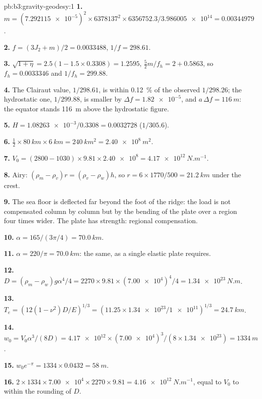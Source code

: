 \begin{solution}{pb:b3:gravity-geodesy:1}
\textbf{1.} $m = (\num{7.292115e-5})^2\times6378137^2\times6356752.3/
\num{3.986005e14} = \num{0.00344979}$.

\textbf{2.} $f = (3J_2 + m)/2 = \num{0.0033488}$, $1/f = 298.61$.

\textbf{3.} $\sqrt{1 + \eta} = 2.5(1 - 1.5\times0.3308) = 1.2595$,
$\tfrac52m/f_h = 2 + 0.5863$, so $f_h = \num{0.0033346}$ and $1/f_h = 299.88$.

\textbf{4.} The Clairaut value, $1/298.61$, is within \qty{0.12}{\percent} of
the observed $1/298.26$; the hydrostatic one, $1/299.88$, is smaller by
$\Delta f = \num{1.82e-5}$, and $a\,\Delta f = \qty{116}{m}$: the equator stands
\qty{116}{m} above the hydrostatic figure.

\textbf{5.} $H = \num{1.08263e-3}/0.3308 = \num{0.0032728}$ ($1/305.6$).

\textbf{6.} $\tfrac12\times\qty{80}{km}\times\qty{6}{km} = \qty{240}{km^2} =
\qty{2.40e8}{m^2}$.

\textbf{7.} $V_0 = (2800 - 1030)\times9.81\times\num{2.40e8} =
\qty{4.17e12}{N.m^{-1}}$.

\textbf{8.} Airy: $(\rho_m - \rho_v)r = (\rho_v - \rho_w)h$, so $r =
6\times1770/500 = \qty{21.2}{km}$ under the crest.

\textbf{9.} The sea floor is deflected far beyond the foot of the ridge: the
load is not compensated column by column but by the bending of the plate over a
region four times wider. The plate has strength: regional compensation.

\textbf{10.} $\alpha = 165/(3\pi/4) = \qty{70.0}{km}$.

\textbf{11.} $\alpha = 220/\pi = \qty{70.0}{km}$: the same, as a single elastic
plate requires.

\textbf{12.} $D = (\rho_m - \rho_w)g\alpha^4/4 = 2270\times9.81\times(\num{7.00e4})^4/4
= \qty{1.34e23}{N.m}$.

\textbf{13.} $T_e = (12(1 - \nu^2)D/E)^{1/3} = (11.25\times\num{1.34e23}/
\num{1e11})^{1/3} = \qty{24.7}{km}$.

\textbf{14.} $w_0 = V_0\alpha^3/(8D) = \num{4.17e12}\times(\num{7.00e4})^3/
(8\times\num{1.34e23}) = \qty{1334}{m}$.

\textbf{15.} $w_0e^{-\pi} = 1334\times0.0432 = \qty{58}{m}$.

\textbf{16.} $2\times1334\times\num{7.00e4}\times2270\times9.81 =
\qty{4.16e12}{N.m^{-1}}$, equal to $V_0$ to within the rounding of $D$.


\end{solution}
